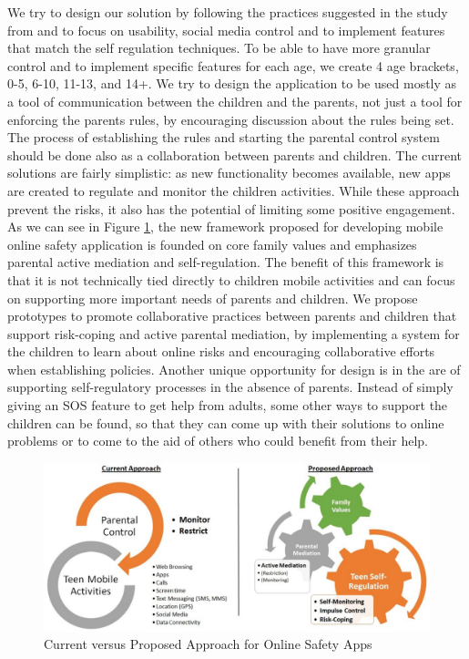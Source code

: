 We try to design our solution by following the practices suggested in the study from \citep{wisniewski2017parental} and to focus on usability, social media control and to implement features that match the self regulation techniques. To be able to have more granular control and to implement specific features for each age, we create 4 age brackets, 0-5, 6-10, 11-13, and 14+. We try to design the application to be used mostly as a tool of communication between the children and the parents, not just a tool for enforcing the parents rules, by encouraging discussion about the rules being set. The process of establishing the rules and starting the parental control system should be done also as a collaboration between parents and children. The current solutions are fairly simplistic: as new functionality becomes available, new apps are created to regulate and monitor the children activities. While these approach prevent the risks, it also has the potential of limiting some positive engagement. As we can see in Figure \ref{fig:current-vs-proposed}, the new framework proposed for developing mobile online safety application is founded on core family values and emphasizes parental active mediation and self-regulation. The benefit of this framework is that it is not technically tied directly to children mobile activities and can focus on supporting more important needs of parents and children. We propose prototypes to promote collaborative practices between parents and children that support risk-coping and active parental mediation, by implementing a system for the children to learn about online risks and encouraging collaborative efforts when establishing policies. Another unique opportunity for design is in the are of supporting self-regulatory processes in the absence of parents. Instead of simply giving an SOS feature to get help from adults, some other ways to support the children can be found, so that they can come up with their solutions to online problems or to come to the aid of others who could benefit from their help.

\begin{figure}[th]
\centering
\includegraphics[width=1\textwidth]{Figures/current-vs-proposed}
\decoRule
\caption{Current versus Proposed Approach for Online Safety Apps}
\label{fig:current-vs-proposed}
\end{figure}


